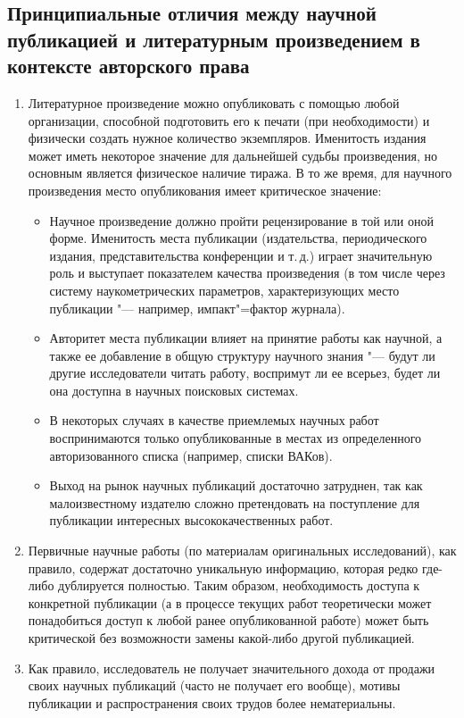 \documentclass [10pt, a5paper]{article}
\begin{document}
\subsection*{Принципиальные отличия между научной публикацией и литературным произведением в контексте авторского права}
\begin{enumerate}
  \item Литературное произведение можно опубликовать с помощью любой организации, способной подготовить его к печати (при необходимости) и физически создать нужное количество экземпляров. Именитость издания может иметь некоторое значение для дальнейшей судьбы произведения, но основным является физическое наличие тиража. В то же время, для научного произведения место опубликования имеет критическое значение:\begin{itemize}
  \item Научное произведение должно пройти рецензирование в той или оной форме. Именитость места публикации (издательства, периодического издания, представительства конференции и т.\,д.) играет значительную роль и выступает показателем качества произведения (в том числе через систему наукометрических параметров, характеризующих место публикации "--- например, импакт"=фактор журнала).
  \item Авторитет места публикации влияет на принятие работы как научной, а также ее добавление в общую структуру научного знания "--- будут ли другие исследователи читать работу, воспримут ли ее всерьез, будет ли она доступна в научных поисковых системах.
  \item В некоторых случаях в качестве приемлемых научных работ воспринимаются только опубликованные в местах из определенного авторизованного списка (например, \linebreak списки ВАКов).
  \item Выход на рынок научных публикаций достаточно затруднен, так как малоизвестному издателю сложно претендовать на поступление для публикации интересных высококачественных работ.
\end{itemize}


  \item Первичные научные работы (по материалам оригинальных исследований), как правило, содержат достаточно уникальную информацию, которая редко где-либо дублируется полностью. Таким образом, необходимость доступа к конкретной публикации (а в процессе текущих работ теоретически может понадобиться доступ к любой ранее опубликованной работе) может быть критической без возможности замены какой-либо другой публикацией.
  \item Как правило, исследователь не получает значительного дохода от продажи своих научных публикаций (часто не получает его вообще), мотивы публикации и распространения своих трудов более нематериальны.
\end{enumerate}
\end{document}
